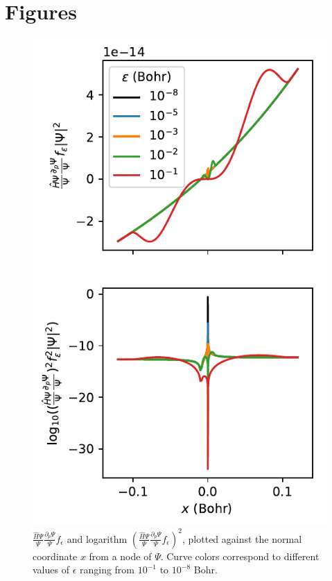 \documentclass{article}
\begin{document}
\section{Figures}
\begin{figure}
\centering
\includegraphics{../2_plots/viznode.pdf}
\caption{$\frac{\hat{H}\Psi}{\Psi}\frac{\partial_p \Psi}{\Psi} f_\epsilon$ and logarithm $(\frac{\hat{H}\Psi}{\Psi}\frac{\partial_p \Psi}{\Psi} f_\epsilon)^2$, plotted against the normal coordinate $x$ from a node of $\Psi$. Curve colors correspond to different values of $\epsilon$ ranging from $10^{-1}$ to $10^{-8}$ Bohr.}
\end{figure}
\end{document}

